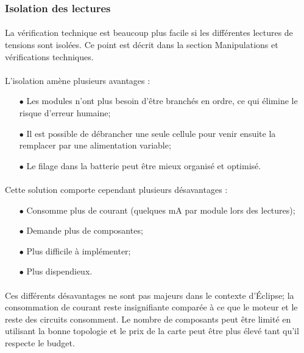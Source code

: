 	\subsubsection*{Isolation des lectures}
	\paragraph*{}
	La vérification technique est beaucoup plus facile si les différentes lectures de tensions sont isolées. Ce point est décrit dans la section Manipulations et vérifications techniques.

	\paragraph*{}
	L'isolation amène plusieurs avantages :

	\begin{itemize}
		\item[$\bullet$] Les modules n'ont plus besoin d'être branchés en ordre, ce qui élimine le risque d'erreur humaine;
		\item[$\bullet$] Il est possible de débrancher une seule cellule pour venir ensuite la remplacer par une alimentation variable;
		\item[$\bullet$] Le filage dans la batterie peut être mieux organisé et optimisé.
	\end{itemize}

	\paragraph*{}
	Cette solution comporte cependant plusieurs désavantages :

	\begin{itemize}
		\item[$\bullet$] Consomme plus de courant (quelques mA par module lors des lectures);
		\item[$\bullet$] Demande plus de composantes;
		\item[$\bullet$] Plus difficile à implémenter;
		\item[$\bullet$] Plus dispendieux.
	\end{itemize}

	\paragraph*{}
	Ces différents désavantages ne sont pas majeurs dans le contexte d'Éclipse; la consommation de courant reste insignifiante comparée à ce que le moteur et le reste des circuits consomment. Le nombre de composants peut être limité en utilisant la bonne topologie et le prix de la carte peut être plus élevé tant qu'il respecte le budget.

